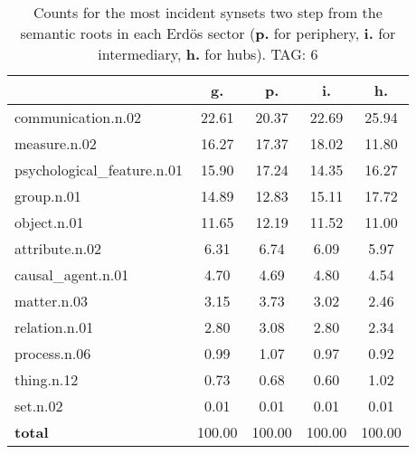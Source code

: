 \begin{table}[h!]
\begin{center}
\begin{tabular}{| l | c | c | c | c |}\hline
 & g. & p. & i. & h. \\\hline
communication.n.02 & 22.61  & 20.37  & 22.69  & 25.94 \\\hline
measure.n.02 & 16.27  & 17.37  & 18.02  & 11.80 \\\hline
psychological\_feature.n.01 & 15.90  & 17.24  & 14.35  & 16.27 \\\hline
group.n.01 & 14.89  & 12.83  & 15.11  & 17.72 \\\hline
object.n.01 & 11.65  & 12.19  & 11.52  & 11.00 \\\hline
attribute.n.02 & 6.31  & 6.74  & 6.09  & 5.97 \\\hline
causal\_agent.n.01 & 4.70  & 4.69  & 4.80  & 4.54 \\\hline
matter.n.03 & 3.15  & 3.73  & 3.02  & 2.46 \\\hline
relation.n.01 & 2.80  & 3.08  & 2.80  & 2.34 \\\hline
process.n.06 & 0.99  & 1.07  & 0.97  & 0.92 \\\hline
thing.n.12 & 0.73  & 0.68  & 0.60  & 1.02 \\\hline
set.n.02 & 0.01  & 0.01  & 0.01  & 0.01 \\\hline
{{\bf total}} & 100.00  & 100.00  & 100.00  & 100.00 \\\hline
\end{tabular}
\caption{Counts for the most incident synsets two step from the semantic roots in each Erd\"os sector ({\bf p.} for periphery, {\bf i.} for intermediary, {\bf h.} for hubs). TAG: 6}
\end{center}
\end{table}